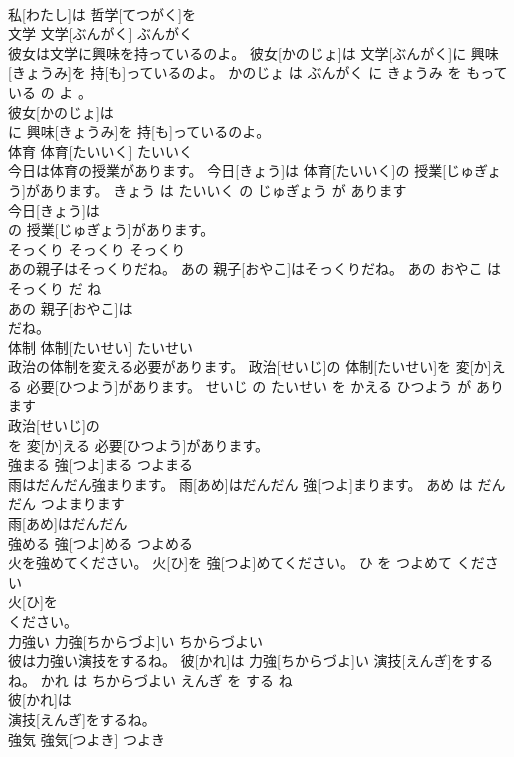 \documentclass[8pt]{extreport}
\begin{document}
\begin{CJK}{UTF8}{min}
\\	私[わたし]は 哲学[てつがく]を
\\	文学	文学[ぶんがく]	ぶんがく	
\\	彼女は文学に興味を持っているのよ。	彼女[かのじょ]は 文学[ぶんがく]に 興味[きょうみ]を 持[も]っているのよ。	かのじょ は ぶんがく に きょうみ を もっている の よ 。	
\\	彼女[かのじょ]は
\\	に 興味[きょうみ]を 持[も]っているのよ。			
\\	体育	体育[たいいく]	たいいく	
\\	今日は体育の授業があります。	今日[きょう]は 体育[たいいく]の 授業[じゅぎょう]があります。	きょう は たいいく の じゅぎょう が あります	
\\	今日[きょう]は
\\	の 授業[じゅぎょう]があります。			
\\	そっくり	そっくり	そっくり	
\\	あの親子はそっくりだね。	あの 親子[おやこ]はそっくりだね。	あの おやこ は そっくり だ ね	
\\	あの 親子[おやこ]は
\\	だね。			
\\	体制	体制[たいせい]	たいせい	
\\	政治の体制を変える必要があります。	政治[せいじ]の 体制[たいせい]を 変[か]える 必要[ひつよう]があります。	せいじ の たいせい を かえる ひつよう が あります	
\\	政治[せいじ]の
\\	を 変[か]える 必要[ひつよう]があります。			
\\	強まる	強[つよ]まる	つよまる	
\\	雨はだんだん強まります。	雨[あめ]はだんだん 強[つよ]まります。	あめ は だんだん つよまります	
\\	雨[あめ]はだんだん
\\	強める	強[つよ]める	つよめる	
\\	火を強めてください。	火[ひ]を 強[つよ]めてください。	ひ を つよめて ください	
\\	火[ひ]を
\\	ください。			
\\	力強い	力強[ちからづよ]い	ちからづよい	
\\	彼は力強い演技をするね。	彼[かれ]は 力強[ちからづよ]い 演技[えんぎ]をするね。	かれ は ちからづよい えんぎ を する ね	
\\	彼[かれ]は
\\	演技[えんぎ]をするね。			
\\	強気	強気[つよき]	つよき	

\end{CJK}
\end{document}
